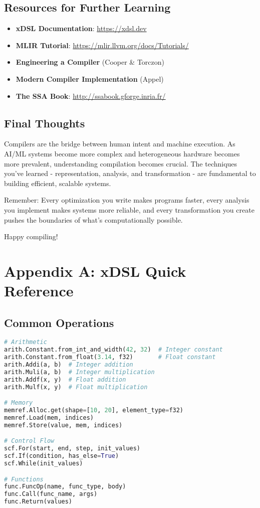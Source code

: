 \documentclass[11pt,a4paper]{article}
\begin{document}
\subsection{Resources for Further Learning}

\begin{itemize}
    \item \textbf{xDSL Documentation}: \url{https://xdsl.dev}
    \item \textbf{MLIR Tutorial}: \url{https://mlir.llvm.org/docs/Tutorials/}
    \item \textbf{Engineering a Compiler} (Cooper \& Torczon)
    \item \textbf{Modern Compiler Implementation} (Appel)
    \item \textbf{The SSA Book}: \url{http://ssabook.gforge.inria.fr/}
\end{itemize}

\subsection{Final Thoughts}

Compilers are the bridge between human intent and machine execution. As AI/ML systems become more complex and heterogeneous hardware becomes more prevalent, understanding compilation becomes crucial. The techniques you've learned - representation, analysis, and transformation - are fundamental to building efficient, scalable systems.

Remember: Every optimization you write makes programs faster, every analysis you implement makes systems more reliable, and every transformation you create pushes the boundaries of what's computationally possible.

Happy compiling!

\appendix

\section{Appendix A: xDSL Quick Reference}

\subsection{Common Operations}

\begin{lstlisting}[language=Python, caption=xDSL Operations Quick Reference]
# Arithmetic
arith.Constant.from_int_and_width(42, 32)  # Integer constant
arith.Constant.from_float(3.14, f32)       # Float constant
arith.Addi(a, b)  # Integer addition
arith.Muli(a, b)  # Integer multiplication
arith.Addf(x, y)  # Float addition
arith.Mulf(x, y)  # Float multiplication

# Memory
memref.Alloc.get(shape=[10, 20], element_type=f32)
memref.Load(mem, indices)
memref.Store(value, mem, indices)

# Control Flow
scf.For(start, end, step, init_values)
scf.If(condition, has_else=True)
scf.While(init_values)

# Functions
func.FuncOp(name, func_type, body)
func.Call(func_name, args)
func.Return(values)
\end{lstlisting}
\end{document}
